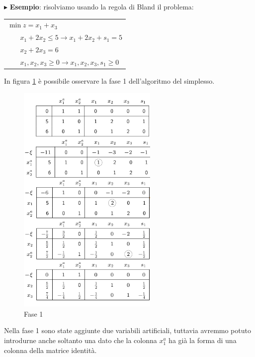 \documentclass[11pt]{book}
\begin{document}
\vspace{11pt}
$\blacktriangleright$ {\bf Esempio}: risolviamo usando la regola di
Bland il problema:

\vspace{11pt}
\begin{center}
  \begin{tabular}{l}
    $\min z = x_1 + x_3$\\
    $\phantom{min}x_1 + 2x_2 \leq 5 \rightarrow x_1 + 2x_2 + s_1 = 5$\\
    $\phantom{min}x_2 + 2x_3 = 6$\\
    $\phantom{min}x_1, x_2, x_3 \geq 0 \rightarrow x_1, x_2, x_3, s_1
    \geq 0$\\
  \end{tabular}
\end{center}
\vspace{11pt}

In figura \ref{cap4fase1} \`e possibile osservare la fase 1
dell'algoritmo del simplesso.

\begin{figure}[h!]
  \centering
  \includegraphics[width=0.6\textwidth]{images/cap4fase1.png}
  \caption{Fase 1}
  \label{cap4fase1}
\end{figure}


Nella fase 1 sono state aggiunte due variabili artificiali, tuttavia
avremmo potuto introdurne anche soltanto una dato che la colonna
$x_1^a$ ha gi\`a la forma di una colonna della matrice identit\`a.
\end{document}
